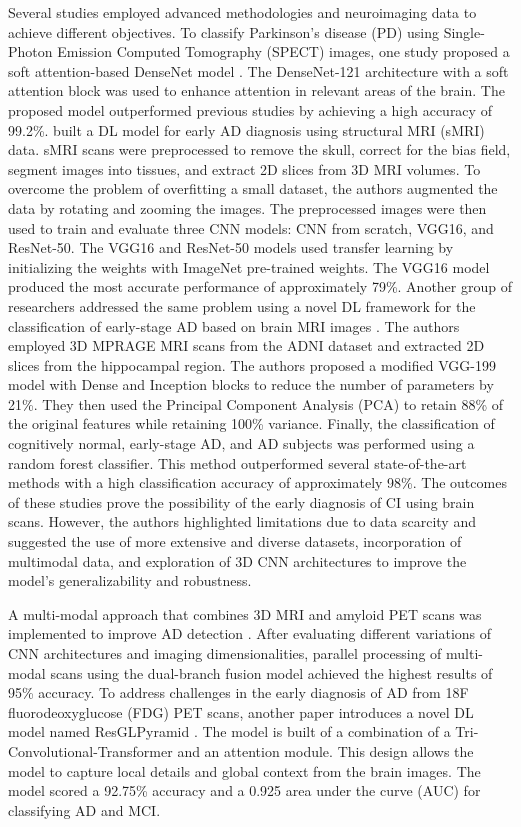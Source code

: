 Several studies employed advanced methodologies and neuroimaging data to achieve different objectives. To classify Parkinson’s disease (\acrshort{PD}) using Single-Photon Emission Computed Tomography (SPECT) images, one study proposed a soft attention-based DenseNet model \cite{Thakur2022Soft}. The DenseNet-121 architecture with a soft attention block was used to enhance attention in relevant areas of the brain. The proposed model outperformed previous studies by achieving a high accuracy of 99.2\%.  built a DL model for early AD diagnosis using structural MRI (\acrshort{sMRI}) data. sMRI scans were preprocessed to remove the skull, correct for the bias field, segment images into tissues, and extract 2D slices from 3D MRI volumes. To overcome the problem of overfitting a small dataset, the authors augmented the data by rotating and zooming the images. The preprocessed images were then used to train and evaluate three CNN models: CNN from scratch, VGG16, and ResNet-50. The VGG16 and ResNet-50 models used transfer learning by initializing the weights with ImageNet pre-trained weights. The VGG16 model produced the most accurate performance of approximately 79\%. Another group of researchers addressed the same problem using a novel DL framework for the classification of early-stage AD based on brain MRI images \cite{Hazarika2023Novel}. The authors employed 3D MPRAGE MRI scans from the ADNI dataset and extracted 2D slices from the hippocampal region. The authors proposed a modified VGG-199 model with Dense and Inception blocks to reduce the number of parameters by 21\%. They then used the Principal Component Analysis (\acrshort{PCA}) to retain 88\% of the original features while retaining 100\% variance. Finally, the classification of cognitively normal, early-stage AD, and AD subjects was performed using a random forest classifier. This method outperformed several state-of-the-art methods with a high classification accuracy of approximately 98\%. The outcomes of these studies prove the possibility of the early diagnosis of CI using brain scans. However, the authors highlighted limitations due to data scarcity and suggested the use of more extensive and diverse datasets, incorporation of multimodal data, and exploration of 3D CNN architectures to improve the model's generalizability and robustness.

A multi-modal approach that combines 3D MRI and amyloid PET scans was implemented to improve AD detection \cite{Castellano2024Automated}. After evaluating different variations of CNN architectures and imaging dimensionalities, parallel processing of multi-modal scans using the dual-branch fusion model achieved the highest results of 95\% accuracy. To address challenges in the early diagnosis of AD from 18F fluorodeoxyglucose (\acrshort{FDG}) PET scans, another paper introduces a novel DL model named ResGLPyramid \cite{Rehman2024Early}. The model is built of a combination of a Tri-Convolutional-Transformer and an attention module. This design allows the model to capture local details and global context from the brain images. The model scored a 92.75\% accuracy and a 0.925 area under the curve (\acrshort{AUC}) for classifying AD and MCI.

